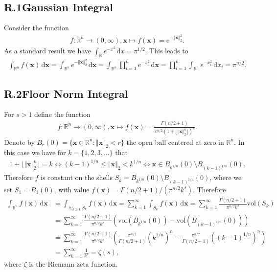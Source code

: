 \documentclass[11pt]{article}
\def\R{\mathbb{R}}
\def\d{\,\mathrm{d}}
\def\bx{\mathbf{x}}
\newcommand{\xNorm}[2]{\left \Vert #1 \right \Vert_{#2} }
\begin{document}
\subsection*{R.1\hspace{0.5cm}Gaussian Integral}
Consider the function
\begin{align*}
f\colon \R^n\to(0,\infty), \bx \mapsto f(\bx) = e^{-\xNorm{\bx}{2}^2}.
\end{align*}
As a standard result we have $\int_{\R} e^{-x^2}\d x = \pi^{1/2}$.
This leads to
\begin{align*}
\int_{\R^n} f(\bx) \d \bx
= \int_{\R^n} e^{-\xNorm{\bx}{2}^2} \d \bx
= \int_{\R^n} \prod_{i=1}^n e^{-x_i^2} \d \bx
= \prod_{i=1}^n \int_{\R^n}  e^{-x_i^2} \d x_i
= \pi^{n/2}.
\end{align*}
%
%
\subsection*{R.2\hspace{0.5cm}Floor Norm Integral}
For $s>1$ define the function
\begin{align*}
f\colon \R^n\to(0,\infty), \bx \mapsto f(\bx) = \frac{\Gamma(n/2+1)}{\pi^{n/2}(1+\lfloor \Vert \bx \Vert_2^n \rfloor)^s}.
\end{align*}
Denote by $B_{r}(0) = \{\bx\in\R^n : \xNorm{\bx}{2}<r\}$ the open ball centered at zero in $\R^n$.
In this case we have for $k=\{1,2,3,\ldots\}$ that
\begin{align*}
1+\lfloor \Vert \bx \Vert_2^n \rfloor = k \Leftrightarrow (k-1)^{1/n} \leq \xNorm{\bx}{2} < k^{1/n} \Leftrightarrow \bx \in B_{k^{1/n}}(0) \setminus B_{(k-1)^{1/n}}(0).
\end{align*}
Therefore $f$ is constant on the shells $S_k = B_{k^{1/n}}(0) \setminus B_{(k-1)^{1/n}}(0)$, where we set $S_1 = B_1(0)$, with value $f(\bx) = \Gamma(n/2+1)/(\pi^{n/2}k^s)$.
Therefore
\begin{align*}
\int_{\R^n} f(\bx) \d \bx
&= \int_{\uplus_{k\geq 1}S_k}  f(\bx) \d \bx
= \sum^{\infty}_{k=1} \int_{S_k}  f(\bx) \d \bx
= \sum^{\infty}_{k=1} \frac{\Gamma(n/2+1)}{\pi^{n/2}k^s} \text{vol}\left(S_k\right)\\
&= \sum^{\infty}_{k=1} \frac{\Gamma(n/2+1)}{\pi^{n/2}k^s} \left(\text{vol}(B_{k^{1/n}}(0))-\text{vol}(B_{(k-1)^{1/n}}(0))\right)\\
&= \sum^{\infty}_{k=1} \frac{\Gamma(n/2+1)}{\pi^{n/2}k^s} \left(\frac{\pi^{n/2}}{\Gamma(n/2+1)}(k^{1/n})^n-
\frac{\pi^{n/2}}{\Gamma(n/2+1)}((k-1)^{1/n})^n
\right)\\
&= \sum^{\infty}_{k=1} \frac{1}{k^s} = \zeta(s),
\end{align*}
where $\zeta$ is the Riemann zeta function.
%
%
%
\end{document}
